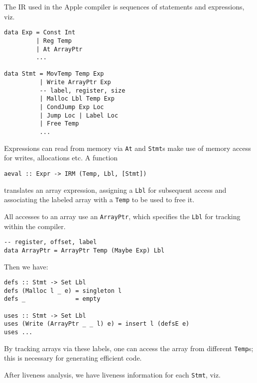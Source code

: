 \documentclass[sigplan,screen,anonymous]{acmart}
\begin{document}
The IR used in the Apple compiler is sequences of statements and expressions, viz.

\begin{verbatim}
data Exp = Const Int
         | Reg Temp
         | At ArrayPtr
         ...

data Stmt = MovTemp Temp Exp
          | Write ArrayPtr Exp
          -- label, register, size
          | Malloc Lbl Temp Exp
          | CondJump Exp Loc
          | Jump Loc | Label Loc
          | Free Temp
          ...
\end{verbatim}

Expressions can read from memory via {\tt At} and {\tt Stmt}s make use of memory access for writes, allocations etc. A function

\begin{verbatim}
aeval :: Expr -> IRM (Temp, Lbl, [Stmt])
\end{verbatim}
translates an array expression, assigning a {\tt Lbl} for subsequent access and associating the labeled array with a {\tt Temp} to be used to free it.

All accesses to an array use an {\tt ArrayPtr}, which specifies the {\tt Lbl} for tracking within the compiler.

\begin{verbatim}
-- register, offset, label
data ArrayPtr = ArrayPtr Temp (Maybe Exp) Lbl
\end{verbatim}

Then we have:

\begin{verbatim}
defs :: Stmt -> Set Lbl
defs (Malloc l _ e) = singleton l
defs _              = empty

uses :: Stmt -> Set Lbl
uses (Write (ArrayPtr _ _ l) e) = insert l (defsE e)
uses ...
\end{verbatim}


By tracking arrays via these labels, one can access the array from different {\tt Temp}s; this is necessary for generating efficient code.


After liveness analysis, we have liveness information for each {\tt Stmt}, viz.

\end{document}
